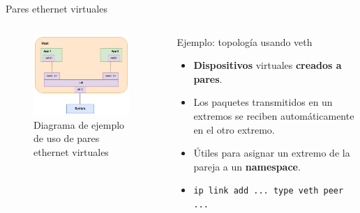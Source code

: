 \documentclass[aspectratio=169,xcolor=dvipsnames]{beamer}
\begin{document}
	\begin{frame}{Pares ethernet virtuales}
	    \begin{columns}
	        \begin{column}{0.5\textwidth}
	                \begin{figure}[h]
                        \includegraphics[width=0.95\textwidth]{img/veth_ej2.png}
                        \caption{Diagrama de ejemplo de uso de pares ethernet virtuales}
                    \end{figure}
	        \end{column}
	        
	        \begin{column}{0.5\textwidth}
	            \begin{block}{Ejemplo: topología usando veth}
	                \begin{itemize}
	                    \item \textbf{Dispositivos} virtuales \textbf{creados a pares}.
	                    \item Los paquetes transmitidos en un extremos se reciben automáticamente en el otro extremo.
	                    \item Útiles para asignar un extremo de la pareja a un \textbf{namespace}.
	                    \item \texttt{ip link add ... type veth peer ...}
	                \end{itemize}
	            \end{block}
	        \end{column}
	    \end{columns}
	\end{frame}
	
\end{document}
